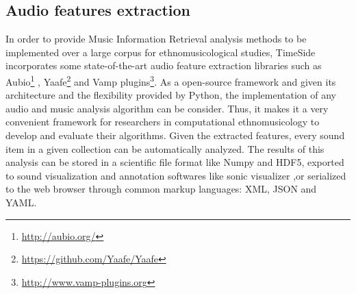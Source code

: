 \documentclass{sig-alternate}
\begin{document}
\subsection{Audio features extraction}
In order to provide Music Information Retrieval analysis methods to be implemented over a large corpus for ethnomusicological studies, TimeSide incorporates some state-of-the-art audio feature extraction libraries such as Aubio\footnote{\url{http://aubio.org/}} \cite{brossierPhD}, Yaafe\footnote{\url{https://github.com/Yaafe/Yaafe}} \cite{yaafe_ISMIR2010} and Vamp plugins\footnote{ \url{http://www.vamp-plugins.org}}.
As a open-source framework and given its architecture and the flexibility provided by Python, the implementation of any audio and music analysis algorithm can be consider. Thus, it makes it a very convenient framework for researchers in computational ethnomusicology to develop and evaluate their algorithms.
Given the extracted features, every sound item in a given collection can be automatically analyzed. The results of this analysis can be stored in a scientific file format like Numpy and HDF5, exported to sound visualization and annotation softwares like sonic visualizer \cite{cannam2006sonic},or serialized to the web browser through common markup languages: XML, JSON and YAML.
%
%
%
\end{document}
